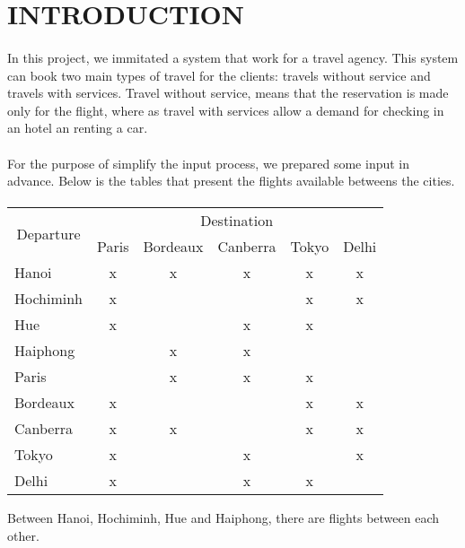 \section{INTRODUCTION}

\paragraph{}
In this project, we immitated a system that work for a travel agency. This system can book two main types of travel for the clients: travels without service and travels with services. Travel without service, means that the reservation is made only for the flight, where as travel with services allow a demand for checking in an hotel an renting a car.

\paragraph{}
For the purpose of simplify the input process, we prepared some input in advance. Below is the tables that present the flights available betweens the cities.

\paragraph{}
\begin{table}[h]
\centering
\begin{tabular}{|l|c|c|c|c|c|}
\hline
\multicolumn{1}{|c|}{\multirow{2}{*}{Departure}} & \multicolumn{5}{c|}{Destination} \\ \cline{2-6} 
\multicolumn{1}{|c|}{} & \multicolumn{1}{l|}{Paris} & \multicolumn{1}{l|}{Bordeaux} & \multicolumn{1}{l|}{Canberra} & \multicolumn{1}{l|}{Tokyo} & \multicolumn{1}{l|}{Delhi} \\ \hline
Hanoi & x & x & x & x & x \\ \hline
Hochiminh & x &  &  & x & x \\ \hline
Hue & x &  & x & x &  \\ \hline
Haiphong &  & x & x &  &  \\ \hline
Paris &  & x & x & x &  \\ \hline
Bordeaux & x &  &  & x & x \\ \hline
Canberra & x & x &  & x & x \\ \hline
Tokyo & x &  & x &  & x \\ \hline
Delhi & x &  & x & x &  \\ \hline
\end{tabular}
\end{table}

Between Hanoi, Hochiminh, Hue and Haiphong, there are flights between each other. 